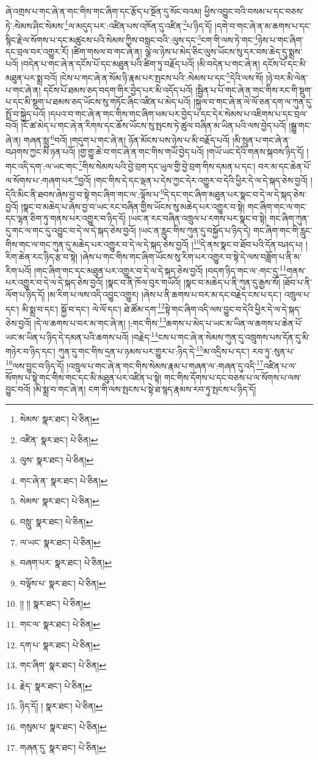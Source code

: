 ཞེ་འགྲས་པ་གང་ཞེ་ན་གང་གིས་གང་ཞིག་དང་རྩོད་པ་སྔོན་དུ་སོང་བའམ། ཕྱིས་འབྱུང་བའི་བསམ་པ་དང་བཅས་ཏེ་:སེམས་ཤིང་སེམས་\footnote{སེམས་  སྣར་ཐང་།  པེ་ཅིན། }ལ་མདུད་པར་:འཛིན་པས་འཁོན་དུ་འཛིན་\footnote{འཛིན་  སྣར་ཐང་།  པེ་ཅིན། }པ་ཉིད་དོ། །དགེ་བ་གང་ཞེ་ན་མ་ཆགས་པ་དང་སྙིང་རྗེ་ལ་སོགས་པ་དང་མཚུངས་པའི་སེམས་ཀྱིས་བསླང་བའི་:ལུས་དང་\footnote{ལུས་  སྣར་ཐང་།  པེ་ཅིན། }ངག་གི་ལས་ཏེ་གང་\footnote{གང་ཞེ་ན་  སྣར་ཐང་།  པེ་ཅིན། }ཉེས་པ་གང་ཞིག་དང་བྲལ་བར་འགྱུར་རོ། །ཚིག་གསལ་བ་གང་ཞེ་ན། ལྕེ་ལ་ཉེས་པ་མེད་ཅིང་ལུས་ཡོངས་སུ་དར་བས་ཆེད་དུ་སྨྲས་པའོ། །བདེན་པ་གང་ཞེ་ན་དངོས་པོ་དང་མཐུན་པའི་ཚིག་ཏུ་བརྗོད་པའོ། །མི་བདེན་པ་གང་ཞེ་ན། དངོས་པོ་དང་མི་མཐུན་པར་སྨྲ་བའོ། །ངེས་པ་གང་ཞེ་ན་སོམ་ཉི་རྣམ་པར་སྤངས་པའི་:སེམས་པ་དང་\footnote{སེམས་  སྣར་ཐང་།  པེ་ཅིན། }དེའི་ལས་སོ། །ཉེ་བར་མི་ལེན་པ་གང་ཞེ་ན། དངོས་པོ་ཐམས་ཅད་བདག་གིར་བྱེད་པར་མི་འདོད་པའོ། །སྦྱིན་པ་པོ་གང་ཞེ་ན་གང་གིས་རང་གི་སྡུག་པ་དང་མི་སྡུག་པ་ཐམས་ཅད་ཡོངས་སུ་གཏོང་ཞིང་འཛིན་པ་མེད་པའོ། །སྐུལ་བ་གང་ཞེ་ན་ལེ་ལོ་ཅན་དག་ལ་ཀུན་དུ་སྤྲོ་བ་སྐྱེད་པའོ། །དཔའ་བ་གང་ཞེ་ན་གང་གིས་གང་ཞིག་ཕམ་པར་བྱེད་པ་དང་དེར་སེམས་པ་འཇིགས་པ་དང་བྲལ་བའོ། །ངོ་ཚ་མེད་པ་གང་ཞེ་ན་རིགས་དང་ཆོས་ཡོངས་སུ་སྤངས་ཏེ་ཚུལ་བཞིན་མ་ཡིན་པའི་ལས་བྱེད་པའོ། །སྒྱུ་གང་ཞེ་ན། གཞན་སླུ་\footnote{བསླུ་  སྣར་ཐང་།  པེ་ཅིན། }བའོ། །གདུག་པ་གང་ཞེ་ན། ཉོན་མོངས་པས་ཉེས་པ་མི་བརྗོད་པའོ། །མི་སྲུན་པ་གང་ཞེ་ན་བཤགས་ཀྱང་མི་ཉན་པའོ། །གྱ་གྱུ་ཆེ་བ་གང་ཞེ་ན་གང་གིས་གཡོ་བྱེད་པའོ། །གཡོ་ཡང་དེའི་གནས་སྐབས་ཉིད་དོ། །གང་འདི་དག་:ལ་ཡང་གང་\footnote{ལ་ཡང་  སྣར་ཐང་།  པེ་ཅིན། }གིས་སེམས་པའི་བྱེ་བྲག་དང་ཡུལ་གྱི་བྱེ་བྲག་གིས་དམན་པ་དང་། བར་མ་དང་ཆེན་པོ་ལ་སོགས་པ་:གཞག་པར་\footnote{བཞག་པར་  སྣར་ཐང་།  པེ་ཅིན། }བྱའོ། །གང་གིས་དེ་དང་ལྡན་པ་དེས་ཀྱང་དེར་འགྱུར་བ་དེའི་ཕྱིར་དེ་ལ་དེ་སྐད་ཅེས་བྱའོ། །དེའི་མིང་ནི་ཐབས་ཞེས་བྱ་བ་སྟེ་གང་ཞིག་གང་ལ་:ལྟོས་པ་\footnote{བལྟོས་པ་  སྣར་ཐང་།  པེ་ཅིན། }དེ་དང་གང་ཞིག་མཐུན་པར་སྣང་བ་དེ་ལ་དེ་སྐད་ཅེས་བྱའོ། །སྣང་བ་མཆེད་པ་ཞེས་བྱ་བ་ཡང་རང་བཞིན་གྱིས་ཡོངས་སུ་མཆེད་པར་འགྱུར་བ་སྟེ། གང་ཞིག་གང་ལ་གང་དང་ལྷན་ཅིག་ཏུ་གནས་པར་འགྱུར་བ་ཉིད་དོ། །ཡང་ན་རང་བཞིན་འཁྲུལ་པ་རགས་པར་སྣང་བ་སྟེ། གང་ཞིག་ཀུན་དུ་གང་ལ་གང་དུ་འབྱུང་བ་དེ་ལ་དེ་སྐད་ཅེས་བྱའོ། །ཡང་ན་རླུང་གིས་ཀུན་དུ་བསྐྱོད་པ་ཉིད་དེ། གང་ཞིག་གང་གི་རླུང་གིས་གང་ལ་གང་ཀུན་དུ་མཆེད་པར་འགྱུར་བ་དེ་ལ་དེ་སྐད་ཅེས་བྱའོ། །\footnote{།། །།  སྣར་ཐང་།  པེ་ཅིན། }དེ་ནས་སྣང་བ་ཐོབ་པའི་དོན་བཤད་པ། །རིག་ཆེན་རང་ཉིད་རྩ་བ་སྟེ། །ཞེས་པ་གང་གིས་གང་ཞིག་ཡོངས་སུ་རིག་པར་འགྱུར་བ་སྟེ་དེ་ལས་བཟློག་པ་ནི་མ་རིག་པའོ། །གང་ཞིག་གང་དང་མཐུན་པར་འགྱུར་བ་དེ་ལ་དེ་སྐད་ཅེས་བྱའོ། །བདག་ཉིད་གང་ལ་:གང་དུ་\footnote{གང་ལ་  སྣར་ཐང་།  པེ་ཅིན། }གནས་པར་འགྱུར་བ་དེ་ལ་དེ་སྐད་ཅེས་བྱའོ། །སྣང་བ་ནི་ཁོལ་བུར་གཡོའོ། །སྣང་བ་མཆེད་པ་ནི་ཀུན་དུ་རྒྱས་སོ། །ཐོབ་པ་ནི་ལོག་པ་ཉིད་དོ། །མ་རིག་པ་ལས་འདི་འབྱུང་འགྱུར། །ཞེས་པ་ནི་ཆགས་པ་བར་མ་དང་བརྗེད་ངས་པ་དང་། འཁྲུལ་པ་དང་། མི་སྨྲ་བ་དང་། སྐྱོ་བ་དང་། ལེ་ལོ་དང་། ཐེ་ཚོམ་དག་\footnote{དག་པ་  སྣར་ཐང་།  པེ་ཅིན། }སྟེ་གང་ཞིག་འདི་ལས་བྱུང་བ་དེའི་ཕྱིར་དེ་ལ་དེ་སྐད་ཅེས་བྱའོ། །དེ་ལ་ཆགས་པ་བར་མ་གང་ཞེ་ན། །:གང་གིས་\footnote{གང་ཞིག་  སྣར་ཐང་།  པེ་ཅིན། }ཆགས་པ་མེད་པ་ཡང་མ་ཡིན་ལ་ཆགས་པ་ཆེན་པོ་ཡང་མ་ཡིན་པ་ཉིད་དེ་དམན་པའི་ཆགས་པའོ། །བརྗེད་\footnote{རྗེད་  སྣར་ཐང་།  པེ་ཅིན། }ངས་པ་གང་ཞེ་ན་སེམས་ཀུན་དུ་འཁྲུགས་པས་དོན་དུ་མི་གཉེར་བ་ཉིད་དང་། ཀུན་དུ་གང་གིས་དྲན་པ་ཉམས་པར་གྱུར་པ་:ཉིད་དེ་\footnote{ཉིད་དོ། །  སྣར་ཐང་།  པེ་ཅིན། }མ་འདྲིས་པ་དང་། རབ་ཏུ་:སུན་པ་\footnote{གསུམ་པ་  སྣར་ཐང་།  པེ་ཅིན། }ལས་བྱུང་བ་ཉིད་དོ། །འཁྲུལ་པ་གང་ཞེ་ན་གང་གིས་སེམས་རྣམ་པ་གཞན་ལ་:གཞན་དུ་འདི་\footnote{གཞན་དུ་  སྣར་ཐང་།  པེ་ཅིན། }འཛིན་པ་ལ་སོགས་པ་སྟེ་གང་གིས་གང་དང་མི་མཐུན་པར་འཛིན་པ་སྟེ། གང་གིས་དོགས་པ་དང་བཅས་པ་ལ་སོགས་པ་ལས་བྱུང་བའོ། །མི་སྨྲ་བ་གང་ཞེ་ན། ངག་གི་ལས་སྤངས་པ་སྟེ་ཐ་སྙད་རྣམས་རབ་ཏུ་སྤངས་པ་ཉིད་དོ། 